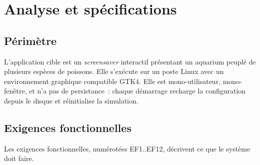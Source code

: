 \chapter{Analyse et spécifications}
\label{chap:analyse}

\section{Périmètre}

L'application cible est un \emph{screensaver} interactif présentant
un aquarium peuplé de plusieurs espèces de poissons. Elle s'exécute
sur un poste Linux avec un environnement graphique compatible GTK4.
Elle est mono-utilisateur, mono-fenêtre, et n'a pas de persistance~:
chaque démarrage recharge la configuration depuis le disque et
réinitialise la simulation.

\section{Exigences fonctionnelles}

Les exigences fonctionnelles, numérotées EF1..EF12, décrivent ce
que le système doit faire.

